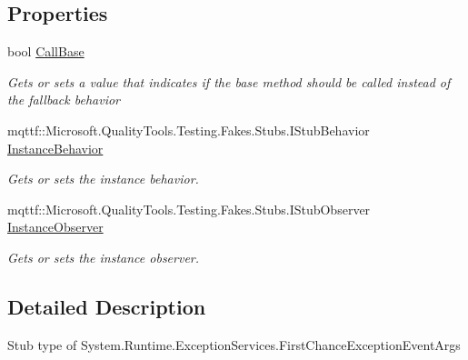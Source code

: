 \subsection*{Properties}
\begin{DoxyCompactItemize}
\item 
bool \hyperlink{class_system_1_1_runtime_1_1_exception_services_1_1_fakes_1_1_stub_first_chance_exception_event_args_a1ccc5b4d0a32dc3c1e5d60ce5d37f30a}{Call\-Base}
\begin{DoxyCompactList}\small\item\em Gets or sets a value that indicates if the base method should be called instead of the fallback behavior\end{DoxyCompactList}\item 
mqttf\-::\-Microsoft.\-Quality\-Tools.\-Testing.\-Fakes.\-Stubs.\-I\-Stub\-Behavior \hyperlink{class_system_1_1_runtime_1_1_exception_services_1_1_fakes_1_1_stub_first_chance_exception_event_args_a4993d454495c1ce8cc1553329a80da7f}{Instance\-Behavior}
\begin{DoxyCompactList}\small\item\em Gets or sets the instance behavior.\end{DoxyCompactList}\item 
mqttf\-::\-Microsoft.\-Quality\-Tools.\-Testing.\-Fakes.\-Stubs.\-I\-Stub\-Observer \hyperlink{class_system_1_1_runtime_1_1_exception_services_1_1_fakes_1_1_stub_first_chance_exception_event_args_adb885e5b1a10612c0d513274a429cbf9}{Instance\-Observer}
\begin{DoxyCompactList}\small\item\em Gets or sets the instance observer.\end{DoxyCompactList}\end{DoxyCompactItemize}


\subsection{Detailed Description}
Stub type of System.\-Runtime.\-Exception\-Services.\-First\-Chance\-Exception\-Event\-Args



